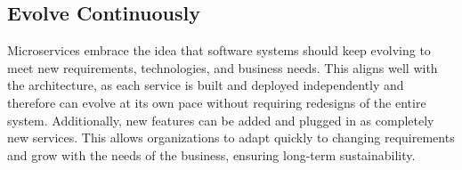 \subsection{Evolve Continuously}
Microservices embrace the idea that software systems should keep evolving to meet new requirements, technologies, and business needs. This aligns well with the architecture, as each service is built and deployed independently and therefore can evolve at its own pace without requiring redesigns of the entire system. Additionally, new features can be added and plugged in as completely new services. This allows organizations to adapt quickly to changing requirements and grow with the needs of the business, ensuring long-term sustainability.